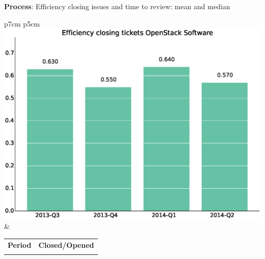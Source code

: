 \documentclass[a4wide,11pt]{report}
\begin{document}
\textbf{Process}: Efficiency closing issues and time to review: mean and median

\begin{tabular}{p{7cm} p{5cm}}
    \vspace{0pt} 
    \includegraphics[scale=.35]{figs/bmiOpenStackSoftware.eps}
    & 
    \vspace{0pt}
    \begin{tabular}{l|l}%
    \bfseries Period & \bfseries Closed/Opened %
    \csvreader[head to column names]{data/bmiOpenStackSoftware.csv}{}%
    {\\ & \bmi}
    \end{tabular}
\end{tabular}
\end{document}
